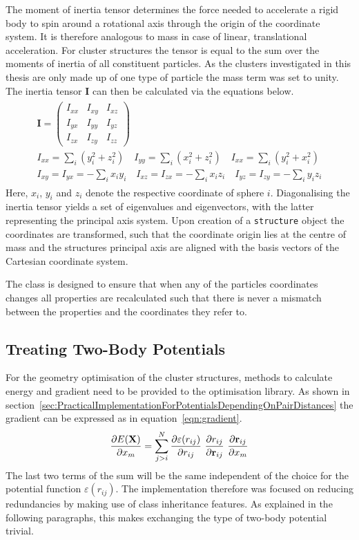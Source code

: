 The moment of inertia tensor determines the force needed to accelerate a rigid
body to spin around a rotational axis through the origin of the coordinate
system. It is therefore analogous to mass in case of linear, translational
acceleration. For cluster structures the tensor is equal to the sum over the
moments of inertia of all constituent particles. As the clusters investigated in
this thesis are only made up of one type of particle the mass term was set to
unity. The inertia tensor $\mathbf{I}$ can then be calculated via the equations
below.
%
\begin{gather}
    \begin{gathered}
    \mathbf{I}=
    \begin{pmatrix}
        I_{xx} & I_{xy} & I_{xz}\\
        I_{yx} & I_{yy} & I_{yz}\\
        I_{zx} & I_{zy} & I_{zz}
    \end{pmatrix}\\
    I_{xx}=\sum_i(y_i^2+z_i^2) \quad I_{yy}=\sum_i(x_i^2+z_i^2) \quad I_{xx}=\sum_i(y_i^2+x_i^2)\\
    I_{xy} = I_{yx} = -\sum_ix_iy_i \quad I_{xz} = I_{zx} = -\sum_ix_iz_i \quad I_{yz} = I_{zy} = -\sum_iy_iz_i
    \end{gathered}
\end{gather}
%
Here, $x_i$, $y_i$ and $z_i$ denote the respective coordinate of sphere $i$.
Diagonalising the inertia tensor yields a set of eigenvalues and eigenvectors,
with the latter representing the principal axis system. Upon creation of a
\verb|structure| object the coordinates are transformed, such that the
coordinate origin lies at the centre of mass and the structures principal axis
are aligned with the basis vectors of the Cartesian coordinate system.

The class is designed to ensure that when any of the particles coordinates
changes all properties are recalculated such that there is never a mismatch
between the properties and the coordinates they refer to.


\subsection{Treating Two-Body Potentials}
\label{sec:thepairpotentialclass}

For the geometry optimisation of the cluster structures, methods to calculate
energy and gradient need to be provided to the optimisation library. As shown in
section~\ref{sec:PracticalImplementationForPotentialsDependingOnPairDistances}
the gradient can be expressed as in equation~\eqref{eqn:gradient}.
%
\begin{align}
    \pdv{E(\mathbf{X})}{x_m}=\sum_{j>i}^N\pdv{\varepsilon(r_{ij})}{r_{ij}}\ \pdv{r_{ij}}{\mathbf{r}_{ij}}\ \pdv{\mathbf{r}_{ij}}{x_m}\label{eqn:gradient}
\end{align}
%
The last two terms of the sum will be the same independent of the choice for the
potential function $\varepsilon(r_{ij})$. The implementation therefore was
focused on reducing redundancies by making use of class inheritance features. As
explained in the following paragraphs, this makes exchanging the type of
two-body potential trivial.

